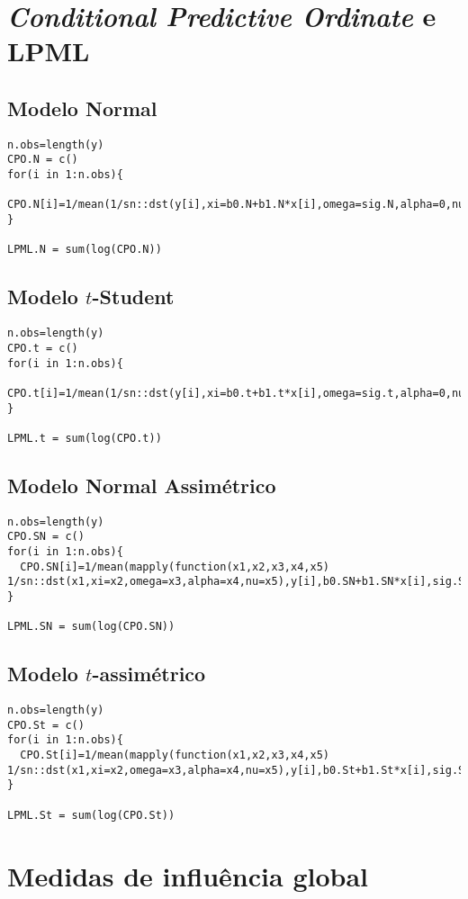 \section{\textit{Conditional Predictive Ordinate} e LPML}
\subsection{Modelo Normal}
\begin{lstlisting}
n.obs=length(y)
CPO.N = c()
for(i in 1:n.obs){
  CPO.N[i]=1/mean(1/sn::dst(y[i],xi=b0.N+b1.N*x[i],omega=sig.N,alpha=0,nu=Inf))
}

LPML.N = sum(log(CPO.N))
\end{lstlisting}

\subsection{Modelo $t$-Student}
\begin{lstlisting}
n.obs=length(y)
CPO.t = c()
for(i in 1:n.obs){
  CPO.t[i]=1/mean(1/sn::dst(y[i],xi=b0.t+b1.t*x[i],omega=sig.t,alpha=0,nu=5))
}

LPML.t = sum(log(CPO.t))
\end{lstlisting}

\subsection{Modelo Normal Assimétrico}
\begin{lstlisting}
n.obs=length(y)
CPO.SN = c()
for(i in 1:n.obs){
  CPO.SN[i]=1/mean(mapply(function(x1,x2,x3,x4,x5) 1/sn::dst(x1,xi=x2,omega=x3,alpha=x4,nu=x5),y[i],b0.SN+b1.SN*x[i],sig.SN,lambda.SN,Inf))
}

LPML.SN = sum(log(CPO.SN))
\end{lstlisting}

\subsection{Modelo $t$-assimétrico}
\begin{lstlisting}
n.obs=length(y)
CPO.St = c()
for(i in 1:n.obs){
  CPO.St[i]=1/mean(mapply(function(x1,x2,x3,x4,x5) 1/sn::dst(x1,xi=x2,omega=x3,alpha=x4,nu=x5),y[i],b0.St+b1.St*x[i],sig.St,lambda.St,5))
}

LPML.St = sum(log(CPO.St))
\end{lstlisting}

\section{Medidas de influência global}
